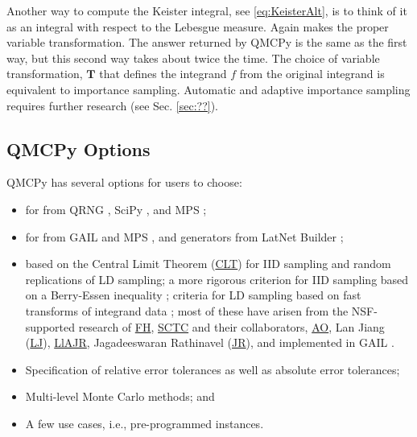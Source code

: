 \documentclass[11pt]{NSFamsart}
\newcommand{\FH}{\hyperlink{FHlink}{FH}\xspace}
\newcommand{\SCTC}{\hyperlink{SCTClink}{SCTC}\xspace}
\newcommand{\AO}{\hyperlink{AOlink}{AO}\xspace}
\newcommand{\JR}{\hyperlink{JRlink}{JR}\xspace}
\newcommand{\LlAJR}{\hyperlink{LlAJRlink}{LlAJR}\xspace}
\newcommand{\LJ}{\hyperlink{LJlink}{LJ}\xspace}
\newcommand{\CLT}{\hyperlink{CLTlink}{CLT}\xspace}
\newcommand{\bT}{{\boldsymbol{T}}}
\begin{document}
Another way to compute the Keister integral, see \eqref{eq:KeisterAlt}, is to think of it as an integral with respect to the Lebesgue measure.  Again  makes the proper variable transformation.  The answer returned by QMCPy is the same as the first way, but this second way takes about twice the time.  The choice of variable transformation, $\bT$ that defines the  integrand $f$ from the original integrand is equivalent to importance sampling.  Automatic and adaptive importance sampling requires further research (see Sec. \ref{sec:??}).

 \subsection{QMCPy Options}
 QMCPy has several options for users to choose:
 \begin{itemize}
 	\item {} for  from  QRNG \cite{QRNG2020},  SciPy \cite{virtanen2020scipy}, and MPS \cite{Nuy17a};

 	\item {} for  from GAIL \cite{ChoEtal20a} and MPS \cite{Nuy17a}, and generators  from LatNet Builder \cite{LatNet};

 	\item {} based on the \hypertarget{CLTlink}{Central Limit Theorem} (\CLT) for IID sampling and random replications of LD sampling;  a more rigorous criterion for IID sampling based on a Berry-Essen inequality \cite{HicEtal14a};  criteria for LD sampling based on fast transforms of integrand data \cite{HicJim16a, JimHic16a,RatHic19a}; most of these have arisen from the NSF-supported research of \FH, \SCTC and their collaborators, \AO, \hypertarget{LJlink}{Lan Jiang} (\LJ),
 	\LlAJR, \hypertarget{JRlink}{Jagadeeswaran Rathinavel} (\JR), and implemented in GAIL \cite{ChoEtal20a}.

 	\item Specification of relative error tolerances as well as absolute error tolerances;

 	\item Multi-level Monte Carlo methods; and

 	\item A few use cases, i.e., pre-programmed  instances.
 \end{itemize}
\end{document}
